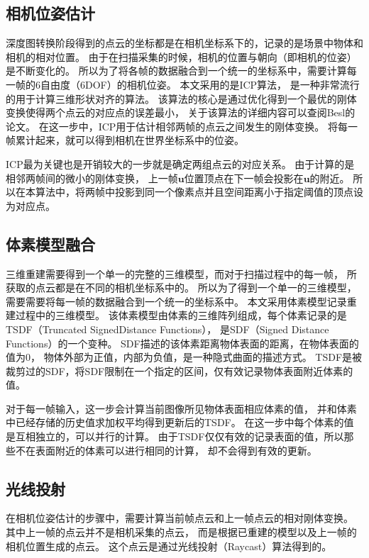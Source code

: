 \subsection{相机位姿估计}
深度图转换阶段得到的点云的坐标都是在相机坐标系下的，记录的是场景中物体和相机的相对位置。
由于在扫描采集的时候，相机的位置与朝向（即相机的位姿）是不断变化的。
所以为了将各帧的数据融合到一个统一的坐标系中，需要计算每一帧的6自由度（6DOF）的相机位姿。
本文采用的是ICP算法\cite{besl1992method}，
是一种非常流行的用于计算三维形状对齐的算法。
该算法的核心是通过优化得到一个最优的刚体变换使得两个点云的对应点的误差最小，
关于该算法的详细内容可以查阅Besl的论文\cite{besl1992method}。
在这一步中，ICP用于估计相邻两帧的点云之间发生的刚体变换。
将每一帧累计起来，就可以得到相机在世界坐标系中的位姿。

ICP最为关键也是开销较大的一步就是确定两组点云的对应关系。
由于计算的是相邻两帧间的微小的刚体变换，
上一帧$\bm{u}$位置顶点在下一帧会投影在$\bm{u}$的附近。
所以在本算法中，将两帧中投影到同一个像素点并且空间距离小于指定阈值的顶点设为对应点。

\subsection{体素模型融合}
三维重建需要得到一个单一的完整的三维模型，而对于扫描过程中的每一帧，
所获取的点云都是在不同的相机坐标系中的。
所以为了得到一个单一的三维模型，需要需要将每一帧的数据融合到一个统一的坐标系中。
本文采用体素模型记录重建过程中的三维模型。
该体素模型由体素的三维阵列组成，每个体素记录的是TSDF（Truncated SignedDistance Functions），
是SDF（Signed Distance Functions）的一个变种。
SDF描述的该体素距离物体表面的距离，在物体表面的值为0，
物体外部为正值，内部为负值，是一种隐式曲面的描述方式。
TSDF是被裁剪过的SDF，将SDF限制在一个指定的区间，仅有效记录物体表面附近体素的值。

对于每一帧输入，这一步会计算当前图像所见物体表面相应体素的值，
并和体素中已经存储的历史值求加权平均得到更新后的TSDF。
在这一步中每个体素的值是互相独立的，可以并行的计算。
由于TSDF仅仅有效的记录表面的值，所以那些不在表面附近的体素可以进行相同的计算，
却不会得到有效的更新。

\subsection{光线投射}
在相机位姿估计的步骤中，需要计算当前帧点云和上一帧点云的相对刚体变换。
其中上一帧的点云并不是相机采集的点云，
而是根据已重建的模型以及上一帧的相机位置生成的点云。
这个点云是通过光线投射（Raycast）算法得到的。


